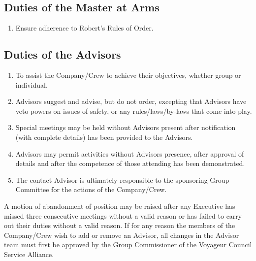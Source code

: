 \subsection{Duties of the Master at Arms}\label{subsec:duties-of-the-master-at-arms}
\begin{enumerate}
    \item Ensure adherence to Robert's Rules of Order.
\end{enumerate}

\subsection{Duties of the Advisors}\label{subsec:duties-of-the-advisors}
\begin{enumerate}
    \item To assist the Company/Crew to achieve their objectives, whether group or individual.
    \item Advisors suggest and advise, but do not order, excepting that Advisors have veto powers on issues of safety, or any rules/laws/by-laws that come into play.
    \item Special meetings may be held without Advisors present after notification (with complete details) has been provided to the Advisors.
    \item Advisors may permit activities without Advisors presence, after approval of details and after the competence of those attending has been demonstrated.
    \item The contact Advisor is ultimately responsible to the sponsoring Group Committee for the actions of the Company/Crew.
\end{enumerate}
A motion of abandonment of position may be raised after any Executive has missed three consecutive meetings without a valid reason or has failed to carry out their duties without a valid reason.
If for any reason the members of the Company/Crew wish to add or remove an Advisor, all changes in the Advisor team must first be approved by the Group Commissioner of the Voyageur Council Service Alliance.
